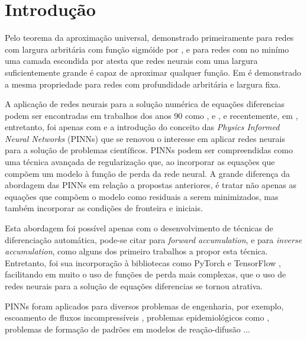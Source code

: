 \chapter{Introdução}
\label{sec-intro}

Pelo teorema da aproximação universal, demonstrado primeiramente para redes com
largura arbritária com função sigmóide por \cite{cybenko:89}, e para redes 
com no minímo uma camada escondida por \cite{hornik:89-aprox-universais} atesta
que redes neurais com uma largura suficientemente grande é capaz de aproximar 
qualquer função. Em \cite{grippen:03-aprox-universais-profundidade} é demonstrado
a mesma propriedade para redes com profundidade arbritária e largura fixa.

A aplicação de redes neurais para a solução numérica de equações diferencias podem
ser encontradas em trabalhos dos anos 90 como \cite{lagaris-etal:98}, 
\cite{meade-fernandez:94} e \cite{psichogios-etal:92}, e recentemente, em
\cite{guasti-santos:21}, entretanto, foi apenas com 
\cite{raissi-etal:19} e a introdução do conceito das 
\textit{Physics Informed Neural Networks} 
(PINNs) que se renovou o interesse em aplicar redes neurais para a solução de 
problemas científicos.
PINNs podem ser compreendidas como uma técnica avançada de regularização que, ao 
incorporar as equações que compõem um modelo à função de perda da rede neural. A
grande diferença da abordagem das PINNs em relação a propostas anteriores, é tratar
não apenas as equações que compõem o modelo como residuais a serem minimizados, mas 
também incorporar as condições de fronteira e iniciais. 

Esta abordagem foi possível apenas com o desenvolvimento de técnicas de 
diferenciação automática, pode-se citar \cite{wengert:64-diferenciao-automatica} 
para \textit{forward accumulation}, e \cite{linnainmaa:76-diferenciao-automatica} 
para \textit{inverse accumulation}, como alguns dos primeiro trabalhos a propor 
esta técnica. Entretanto, foi sua incorporação à bibliotecas como 
PyTorch \cite{pytorch:19} e TensorFlow \cite{tensorflow:16}, facilitando em muito
o uso de funções de perda mais complexas, que o uso de redes neurais para a solução
de equações diferencias se tornou atrativa. 

PINNs foram aplicados para diversos problemas de engenharia, por exemplo,
escoamento de fluxos incompressíveis \cite{jin-et-al:21-navier-stokes}, 
problemas epidemiológicos como \cite{shaier-etal:22-dinns}, problemas de formação
de padrões em modelos de reação-difusão \cite{giampaolo-etal:22-gray-scott}...

